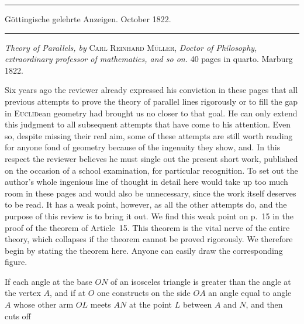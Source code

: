 \begin{center}
\rule{.85\textwidth}{.3pt}\par
Göttingische gelehrte Anzeigen. October 1822.\par
\rule{.85\textwidth}{.3pt}
\end{center}
\hspace*{\parindent}\textit{Theory of Parallels, by} \textsc{Carl Reinhard Müller}, \textit{Doctor of Philosophy, extraordinary professor of mathematics, and so on.} 40 pages in quarto. Marburg 1822.

Six years ago the reviewer already expressed his conviction in these pages that all previous attempts to prove the theory of parallel lines rigorously or to fill the gap in \textsc{Euclid}ean geometry had brought us no closer to that goal. He can only extend this judgment to all subsequent attempts that have come to his attention. Even so, despite missing their real aim, some of these attempts are still worth reading for anyone fond of geometry because of the ingenuity they show, and. In this respect the reviewer believes he must single out the present short work, published on the occasion of a school examination, for particular recognition. To set out the author's whole ingenious line of thought in detail here would take up too much room in these pages and would also be unnecessary, since the work itself deserves to be read. It has a weak point, however, as all the other attempts do, and the purpose of this review is to bring it out. We find this weak point on p.~15 in the proof of the theorem of Article~15. This theorem is the vital nerve of the entire theory, which collapses if the theorem cannot be proved rigorously. We therefore begin by stating the theorem here. Anyone can easily draw the corresponding figure.

If each angle at the base \(ON\) of an isosceles triangle is greater than the angle at the vertex \(A\), and if at \(O\) one constructs on the side \(OA\) an angle equal to angle \(A\) whose other arm \(OL\) meets \(AN\) at the point \(L\) between \(A\) and \(N\), and then cuts off
